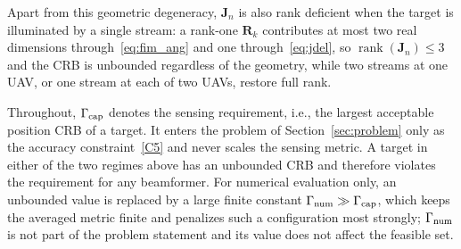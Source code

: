 \documentclass[conference]{IEEEtran}
\begin{document}
Apart from this geometric degeneracy, $\mathbf J_n$ is also rank deficient when the target is illuminated by a single stream: a rank-one $\mathbf R_k$ contributes at most two real dimensions through~\eqref{eq:fim_ang} and one through~\eqref{eq:jdel}, so $\operatorname{rank}(\mathbf J_n)\le3$ and the CRB is unbounded regardless of the geometry, while two streams at one UAV, or one stream at each of two UAVs, restore full rank.

Throughout, $\Gamma_{\rm cap}$ denotes the sensing requirement, i.e., the largest acceptable position CRB of a target. It enters the problem of Section~\ref{sec:problem} only as the accuracy constraint~\eqref{C5} and never scales the sensing metric. A target in either of the two regimes above has an unbounded CRB and therefore violates the requirement for any beamformer. For numerical evaluation only, an unbounded value is replaced by a large finite constant $\Gamma_{\rm num}\gg\Gamma_{\rm cap}$, which keeps the averaged metric finite and penalizes such a configuration most strongly; $\Gamma_{\rm num}$ is not part of the problem statement and its value does not affect the feasible set.
\end{document}
